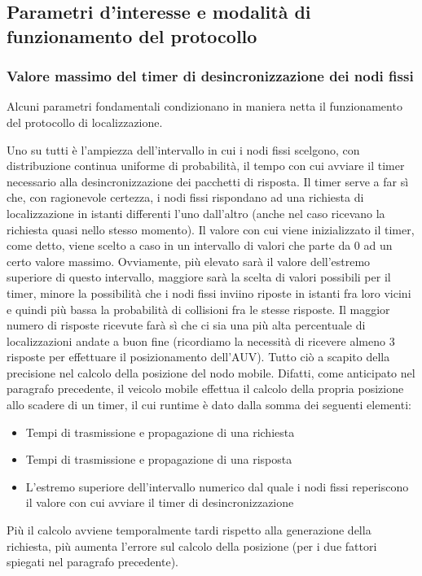 \documentclass[Lau,binding=0.6cm]{sapthesis}
\begin{document}
\subsection{Parametri d'interesse e modalità di funzionamento del protocollo}
\subsubsection{Valore massimo del timer di desincronizzazione dei nodi fissi}
Alcuni parametri fondamentali condizionano in maniera netta il funzionamento del protocollo di localizzazione.\par Uno su tutti è l'ampiezza dell'intervallo
in cui i nodi fissi scelgono, con distribuzione continua uniforme di probabilità, il tempo con cui avviare il timer necessario alla desincronizzazione dei pacchetti di risposta.
Il timer serve a far sì che, con ragionevole certezza, i nodi fissi rispondano ad una richiesta di localizzazione in istanti differenti l'uno dall'altro (anche nel caso ricevano la richiesta quasi nello stesso momento).
Il valore con cui viene inizializzato il timer, come detto, viene scelto a caso in un intervallo di valori che parte da 0 ad un certo valore massimo.
Ovviamente, più elevato sarà il valore dell'estremo superiore di questo intervallo, maggiore sarà la scelta di valori possibili per il timer, minore la possibilità che i nodi fissi inviino riposte in istanti fra loro vicini e quindi
più bassa la probabilità di collisioni fra le stesse risposte. Il maggior numero di risposte ricevute farà sì che ci sia una più alta percentuale di localizzazioni andate a buon fine (ricordiamo la necessità di ricevere almeno 3 risposte per effettuare il posizionamento dell'AUV).\newline
Tutto ciò a scapito della precisione nel calcolo della posizione del nodo mobile. Difatti, come anticipato nel paragrafo precedente, il veicolo mobile effettua il calcolo della propria posizione allo scadere di un timer, il cui runtime è dato dalla somma dei seguenti elementi:
\begin{itemize}
    \item Tempi di  trasmissione e propagazione di una richiesta
    \item Tempi di  trasmissione e propagazione di una risposta
    \item L'estremo superiore dell'intervallo numerico dal quale i nodi fissi reperiscono il valore con cui avviare il timer di desincronizzazione
\end{itemize}
Più il calcolo avviene temporalmente tardi rispetto alla generazione della richiesta, più aumenta l'errore sul calcolo della posizione (per i due fattori spiegati nel paragrafo precedente).
\end{document}

